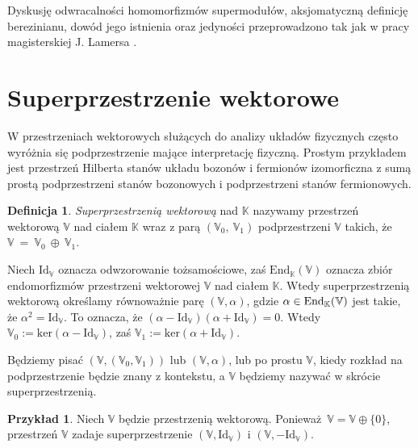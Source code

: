 \documentclass[11pt,a4paper]{report}
\theoremstyle{definition}
\newtheorem{example}[theorem]{Przykład}
\newtheorem{definition}[theorem]{Definicja}
\begin{document}
Dyskusję odwracalności homomorfizmów supermodułów, aksjomatyczną definicję berezinianu, dowód jego istnienia oraz jedyności przeprowadzono tak jak w pracy magisterskiej J. Lamersa \cite{lamers}.

\section{Superprzestrzenie wektorowe}

W przestrzeniach wektorowych służących do analizy układów fizycznych często wyróżnia się podprzestrzenie mające interpretację fizyczną. Prostym przykładem jest przestrzeń Hilberta stanów układu bozonów i fermionów izomorficzna z sumą prostą podprzestrzeni stanów bozonowych i podprzestrzeni stanów fermionowych.

\begin{definition}
	\textit{Superprzestrzenią wektorową} nad $\mathbb{K}$ nazywamy przestrzeń wektorową $\mathbb{V}$ nad ciałem $\mathbb{K}$ wraz z parą $(\mathbb{V}_0,\ \mathbb{V}_1)$ podprzestrzeni $\mathbb{V}$ takich, że $\mathbb{V}~=~\mathbb{V}_0~\oplus~\mathbb{V}_1.$
\end{definition}

Niech $\mathrm{Id}_\mathbb{V}$ oznacza odwzorowanie tożsamościowe, zaś $\mathrm{End}_\mathbb{K} (\mathbb{V})$ oznacza zbiór endomorfizmów przestrzeni wektorowej $\mathbb{V}$ nad ciałem $\mathbb{K}$. Wtedy superprzestrzenią wektorową określamy równoważnie parę $\left( \mathbb{V}, \alpha \right)$, gdzie $\alpha \in \rm{End_{\mathbb{K}}(\mathbb{V})}$ jest takie, że $\alpha^2 = \textrm{Id}_\mathbb{V}$. To oznacza, że $( \alpha - \textrm{Id}_\mathbb{V} )(\alpha + \textrm{Id}_\mathbb{V} ) = 0$. Wtedy $\mathbb{V}_0 := \textrm{ker} ( \alpha - \textrm{Id}_\mathbb{V} )$, zaś $\mathbb{V}_1 := \textrm{ker}(\alpha + \textrm{Id}_\mathbb{V} )$.

Będziemy pisać $\left( \mathbb{V},(\mathbb{V}_0,\mathbb{V}_1) \right)$ lub $\left( \mathbb{V}, \alpha \right)$, lub po prostu $\mathbb{V}$, kiedy rozkład na podprzestrzenie będzie znany z kontekstu, a $\mathbb{V}$ będziemy nazywać w skrócie superprzestrzenią.

\begin{example}
	Niech $\mathbb{V}$ będzie przestrzenią wektorową. Ponieważ~$\mathbb{V} = \mathbb{V} \oplus \{0\}$, przestrzeń $\mathbb{V}$ zadaje superprzestrzenie $(\mathbb{V}, \textrm{Id}_\mathbb{V})$ i $(\mathbb{V}, -\textrm{Id}_\mathbb{V})$.
\end{example}
\end{document}
